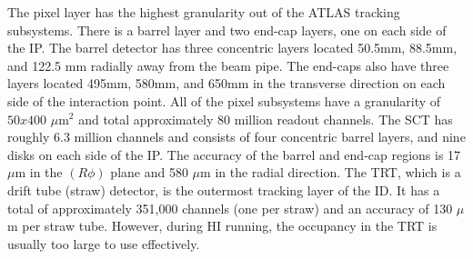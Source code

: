 The pixel layer has the highest granularity out of the ATLAS tracking subsystems. There is a barrel layer and two end-cap layers, one on each side of the IP. The barrel detector has three concentric layers located 50.5mm, 88.5mm, and 122.5 mm radially away from the beam pipe. The end-caps also have three layers located 495mm, 580mm, and 650mm in the transverse direction on each side of the interaction point. All of the pixel subsystems have a granularity of $50x400$ $\mu\mathrm{m}^{2}$ and total approximately 80 million readout channels. The SCT has roughly 6.3 million channels and consists of four concentric barrel layers, and nine disks on each side of the IP. The accuracy of the barrel and end-cap regions is 17 $\mu$m in the $(R\phi)$ plane and 580 $\mu$m in the radial direction. The TRT, which is a drift tube (straw) detector, is the outermost tracking layer of the ID. It has a total of approximately 351,000 channels (one per straw) and an accuracy of 130 $\mu$m per straw tube. However, during HI running, the occupancy in the TRT is usually too large to use effectively.

\FloatBarrier

